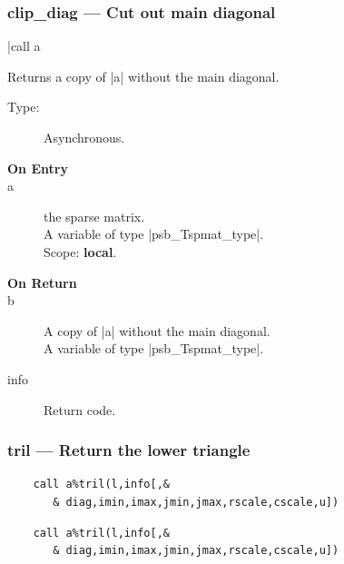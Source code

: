 \subsubsection{clip\_diag --- Cut out main diagonal}
\fortinline|call a%

Returns a copy of \fortinline|a| without the main diagonal.
\begin{description}
\item[Type:] Asynchronous.
\item[\bf On Entry]
\item[a] the sparse matrix.\\
A variable of type \fortinline|psb_Tspmat_type|.\\
Scope: {\bf local}.\\
\end{description}
\begin{description}
\item[\bf On Return]
\item[b] A copy  of  \fortinline|a| without the main diagonal.\\
A variable of type \fortinline|psb_Tspmat_type|.
\item[info] Return code. 
\end{description}


\subsubsection{tril --- Return the lower triangle}

\ifpdf
\begin{verbatim}
    call a%tril(l,info[,&
       & diag,imin,imax,jmin,jmax,rscale,cscale,u])
\end{verbatim}
\else
\begin{verbatim}
    call a%tril(l,info[,&
       & diag,imin,imax,jmin,jmax,rscale,cscale,u])
\end{verbatim}
\fi 


